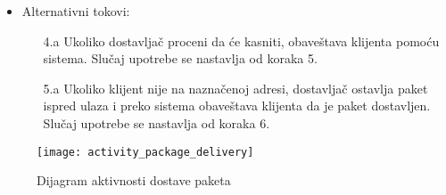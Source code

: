 \begin{itemize}
		\item{Alternativni tokovi:}
			\begin{enumerate}
				\item[4.a] Ukoliko dostavljač proceni da će kasniti, obaveštava klijenta pomoću sistema. Slučaj upotrebe se nastavlja od koraka 5.
				\item[5.a] Ukoliko klijent nije na naznačenoj adresi, dostavljač ostavlja paket ispred ulaza i preko sistema obaveštava klijenta da je paket dostavljen. Slučaj upotrebe se nastavlja od koraka 6.
			\end{enumerate}
	\end{itemize}
	
\begin{figure}[H]
	\begin{center}
		\texttt{[image: activity\_package\_delivery]}
	\end{center}
	\caption{Dijagram aktivnosti dostave paketa}
\end{figure}	
